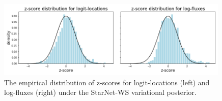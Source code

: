 \begin{figure}[tb]
    \centering
    \includegraphics[width=0.99\textwidth]{figures/m2_results/zscore_calibration.png}
    \vspace{-0.5cm}
    \caption{The empirical distribution of z-scores for logit-locations (left) and log-fluxes (right) under the StarNet-WS variational posterior. 
}
    \label{fig:z-score_calibration}
\end{figure}





